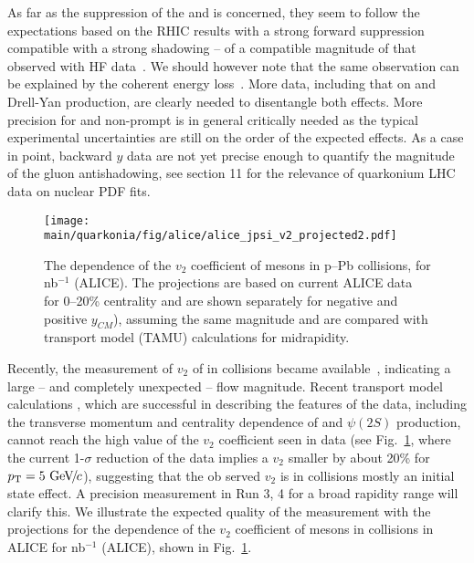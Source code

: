 \documentclass[../report.tex]{subfiles}
\providecommand{\main}{..}
\begin{document}
As far as the suppression of the  and \PJgy is concerned, they seem to follow the expectations based on the RHIC results with a strong forward suppression compatible with a strong shadowing -- of a compatible magnitude of that observed with HF data~\cite{Kusina:2017gkz}. We should however note that the same observation can be explained by the coherent energy loss~\cite{Arleo:2010rb}. More data, including that on \PGU and Drell-Yan production, are clearly needed to disentangle both effects. More precision for \PGU and non-prompt \PJgy is in general critically needed as the typical experimental uncertainties are still on the order of the expected effects. As a case in point, backward $y$ data are not yet precise enough to quantify the magnitude of the gluon antishadowing, see section 11 for the relevance of quarkonium \pPb LHC data on nuclear PDF fits.

\begin{figure}[h]
 \begin{center}
  \texttt{[image: \\main/quarkonia/fig/alice/alice\_jpsi\_v2\_projected2.pdf]}
 \end{center}
 \caption{The \pT dependence of the $v_2$ coefficient of \PJgy mesons in p--Pb collisions, for \unit[500]{nb}$^{-1}$ (ALICE). The projections are based on current ALICE data for 0--20\% centrality \cite{Acharya:2017tfn}  and are shown separately for negative and positive $y_{CM}$), assuming the same magnitude and are compared with transport model (TAMU) calculations \cite{Du:2018wsj} for midrapidity.}
\label{FigQ:v2pTpPb}
\end{figure}

Recently, the measurement of $v_2$ of \PJgy in \pPb collisions became available~\cite{Acharya:2017tfn,Sirunyan:2018ki}, indicating a large -- and completely unexpected -- flow magnitude.
Recent transport model calculations \cite{Du:2018wsj}, which are successful in describing the features of the data, including the transverse momentum and centrality dependence of  \PJgy  and $\psi(2S)$ production, cannot reach the high value of the $v_2$ coefficient seen in data \cite{Acharya:2017tfn,Sirunyan:2018kiz} (see Fig.~\ref{FigQ:v2pTpPb}, where the current 1-$\sigma$ reduction of the data implies a $v_2$ smaller by about 20\% for $p\sb{\scriptstyle\mathrm{T}}=5~\text{GeV}\!/\mspace{-2mu}c$), %
suggesting that the ob served $v_2$ is in \pPb collisions mostly an initial state effect.
A precision measurement in Run 3, 4 for a broad rapidity range %
will clarify this.
We illustrate the expected quality of the measurement with the projections for the \pT dependence of the $v_2$ coefficient of \PJgy mesons in \pPb collisions in ALICE for \unit[500]{nb}$^{-1}$ (ALICE), shown in Fig.~\ref{FigQ:v2pTpPb}.
\end{document}
